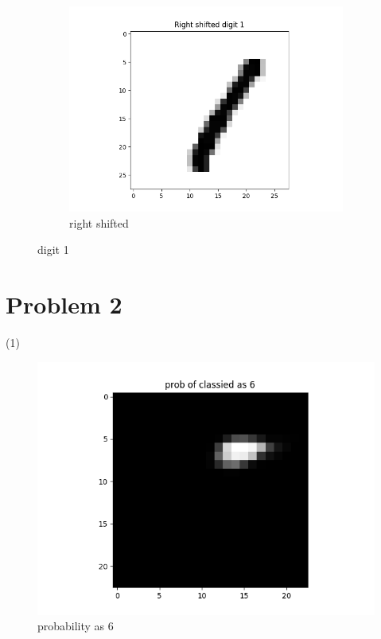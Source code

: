 \documentclass[12pt]{article}
\begin{document}
\begin{figure}[h]
\begin{subfigure}[b]{0.32\linewidth}
    \includegraphics [width=\linewidth]{digit1_right.png}
    \caption {right shifted}
    \end{subfigure}
    \caption {digit 1}
\end{figure}
\clearpage

\section {Problem 2}
(1)
\begin{figure}[h]
    \centering
    \includegraphics [scale=0.35]{digit6_prob_as_6.png}
    \caption {probability as 6}
\end{figure}
\end{document}
